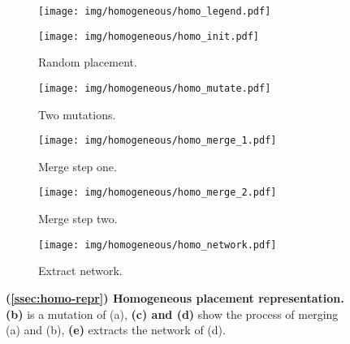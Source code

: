 \begin{figure}[H]
\centering
\captionsetup{justification=centering}
%
\begin{subfigure}{1.0 \columnwidth}
\centering
\texttt{[image: img/homogeneous/homo\_legend.pdf]}
\vspace{-1.0em}
\end{subfigure}
%
\begin{subfigure}{0.19 \columnwidth}
\centering
\texttt{[image: img/homogeneous/homo\_init.pdf]}
\caption{Random placement.}
\label{fig:homo-plac-init}
\end{subfigure}
%
\begin{subfigure}{0.19 \columnwidth}
\centering
\texttt{[image: img/homogeneous/homo\_mutate.pdf]}
\caption{Two mutations.}
\label{fig:homo-plac-mutate}
\end{subfigure}
%
\begin{subfigure}{0.19 \columnwidth}
\centering
\texttt{[image: img/homogeneous/homo\_merge\_1.pdf]}
\caption{Merge step one.}
\label{fig:homo-plac-merge-1}
\end{subfigure}
%
\begin{subfigure}{0.19 \columnwidth}
\centering
\texttt{[image: img/homogeneous/homo\_merge\_2.pdf]}
\caption{Merge step two.}
\label{fig:homo-plac-merge-2}
\end{subfigure}
%
\begin{subfigure}{0.19 \columnwidth}
\centering
\texttt{[image: img/homogeneous/homo\_network.pdf]}
\caption{Extract network.}
\label{fig:homo-plac-network}
\end{subfigure}
%
\caption{
\textbf{(\textsection \ref{ssec:homo-repr}) Homogeneous placement representation.}
\textbf{(b)} is a mutation of (a), \textbf{(c) and (d)} show the process of merging (a) and (b), \textbf{(e)} extracts the network of (d).
}
\vspace{-0.75em}
\label{fig:homo-plac}
\end{figure}
